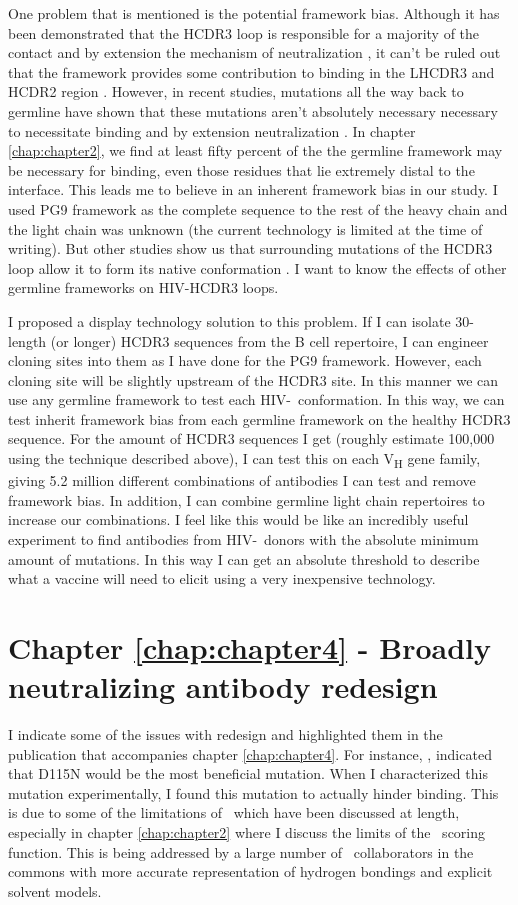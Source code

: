 One problem that is mentioned is the potential framework bias. Although it has been demonstrated that the HCDR3 loop is responsible for a majority of the contact and by extension the mechanism of neutralization \citep{Pejchal:2010fp,Pancera:2010hh}, it can't be ruled out that the framework provides some contribution to binding in the LHCDR3 and HCDR2 region \citep{McLellan:2011dg}. However, in recent studies, mutations all the way back to germline have shown that these mutations aren't absolutely necessary necessary to necessitate binding and by extension neutralization \citep{Klein:2013iz}. In chapter \ref{chap:chapter2}, we find at least fifty percent of the the germline framework may be necessary for binding, even those residues that lie extremely distal to the interface. This leads me to believe in an inherent framework bias in our study. I used PG9 framework as the complete sequence to the rest of the heavy chain and the light chain was unknown (the current technology is limited at the time of writing). But other studies show us that surrounding mutations of the HCDR3 loop allow it to form its native conformation \citep{Wong:2011ff}. I want to know the effects of other germline frameworks on HIV-\naive HCDR3 loops.

I proposed a display technology solution to this problem. If I can isolate 30-length (or longer) HCDR3 sequences from the B cell repertoire, I can engineer cloning sites into them as I have done for the PG9 framework. However, each cloning site will be slightly upstream of the HCDR3 site. In this manner we can use any germline framework to test each HIV-\naive~conformation. In this way, we can test inherit framework bias from each germline framework on the healthy HCDR3 sequence. For the amount of HCDR3 sequences I get (roughly estimate 100,000 using the technique described above), I can test this on each V\textsubscript{H} gene family, giving 5.2 million different combinations of antibodies I can test and remove framework bias. In addition, I can combine germline light chain repertoires to increase our combinations. I feel like this would be like an incredibly useful experiment to find antibodies from HIV-\naive~donors with the absolute minimum amount of mutations. In this way I can get an absolute threshold to describe what a vaccine will need to elicit using a very inexpensive technology.

\section{Chapter \ref{chap:chapter4} - Broadly neutralizing antibody redesign}
I indicate some of the issues with redesign and highlighted them in the publication that accompanies chapter \ref{chap:chapter4}. For instance, \rosettadesign, indicated that D115N would be the most beneficial mutation. When I characterized this mutation experimentally, I found this mutation to actually hinder binding. This is due to some of the limitations of \rosetta~which have been discussed at length, especially in chapter \ref{chap:chapter2} where I discuss the limits of the \rosetta~scoring function. This is being addressed by a large number of \rosetta~collaborators in the commons with more accurate representation of hydrogen bondings and explicit solvent models.


